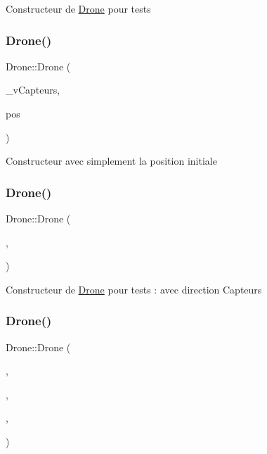 Constructeur de \mbox{\hyperlink{class_drone}{Drone}} pour tests \mbox{\label{class_drone_aa48e4bdade6c74bee3135dcbeb63a564}} 
\subsubsection{\texorpdfstring{Drone()}{Drone()}\hspace{0.1cm}{\footnotesize\ttfamily [2/6]}}
{\footnotesize\ttfamily Drone\+::\+Drone (\begin{DoxyParamCaption}\item[{std\+::vector$<$ \mbox{\hyperlink{class_capteur}{Capteur}} $>$}]{\+\_\+v\+Capteurs,  }\item[{const \mbox{\hyperlink{class_vecteur_r3}{Vecteur\+R3}}}]{pos }\end{DoxyParamCaption})}

Constructeur avec simplement la position initiale \mbox{\label{class_drone_a5a19cc2f816b25fb30687ac2411ba838}} 
\subsubsection{\texorpdfstring{Drone()}{Drone()}\hspace{0.1cm}{\footnotesize\ttfamily [3/6]}}
{\footnotesize\ttfamily Drone\+::\+Drone (\begin{DoxyParamCaption}\item[{std\+::vector$<$ \mbox{\hyperlink{class_capteur}{Capteur}} $>$}]{,  }\item[{const std\+::vector$<$ \mbox{\hyperlink{class_vecteur_r3}{Vecteur\+R3}} $>$}]{ }\end{DoxyParamCaption})}

Constructeur de \mbox{\hyperlink{class_drone}{Drone}} pour tests \+: avec direction Capteurs \mbox{\label{class_drone_a38da96f40b761385be1ad4a793fc037e}} 
\subsubsection{\texorpdfstring{Drone()}{Drone()}\hspace{0.1cm}{\footnotesize\ttfamily [4/6]}}
{\footnotesize\ttfamily Drone\+::\+Drone (\begin{DoxyParamCaption}\item[{std\+::vector$<$ \mbox{\hyperlink{class_capteur}{Capteur}} $>$}]{,  }\item[{const float \&}]{,  }\item[{const \mbox{\hyperlink{class_comportement}{Comportement}} \&}]{,  }\item[{const std\+::vector$<$ \mbox{\hyperlink{class_vecteur_r3}{Vecteur\+R3}} $>$}]{ }\end{DoxyParamCaption})}

